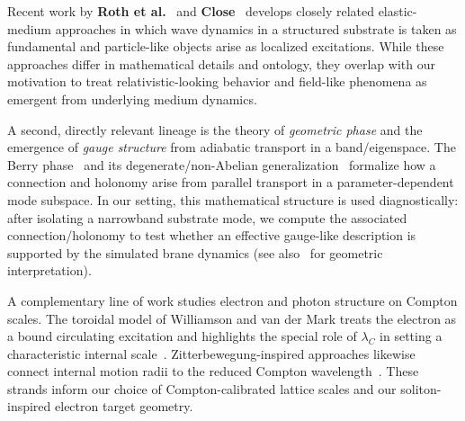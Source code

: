 Recent work by \textbf{Roth et al.}~\cite{Roth2023QQM2} and \textbf{Close}~\cite{Close2025EquationEverything}
develops closely related elastic-medium approaches in which wave dynamics in a structured substrate
is taken as fundamental and particle-like objects arise as localized excitations. While these
approaches differ in mathematical details and ontology, they overlap with our motivation to treat
relativistic-looking behavior and field-like phenomena as emergent from underlying medium dynamics.

A second, directly relevant lineage is the theory of \emph{geometric phase} and the emergence of
\emph{gauge structure} from adiabatic transport in a band/eigenspace. The Berry phase~\cite{Berry1984}
and its degenerate/non-Abelian generalization~\cite{WilczekZee1984} formalize how a connection and
holonomy arise from parallel transport in a parameter-dependent mode subspace. In our setting, this
mathematical structure is used diagnostically: after isolating a narrowband substrate mode, we
compute the associated connection/holonomy to test whether an effective gauge-like description is
supported by the simulated brane dynamics (see also~\cite{Katanaev2009} for geometric interpretation).

A complementary line of work studies electron and photon structure on Compton scales. The toroidal
model of Williamson and van der Mark treats the electron as a bound circulating excitation and
highlights the special role of $\lambda_C$ in setting a characteristic internal scale~\cite{Williamson1997,Williamson2015}.
Zitterbewegung-inspired approaches likewise connect internal motion radii to the reduced Compton
wavelength~\cite{UrdanetaSantos2023}. These strands inform our choice of Compton-calibrated lattice
scales and our soliton-inspired electron target geometry.